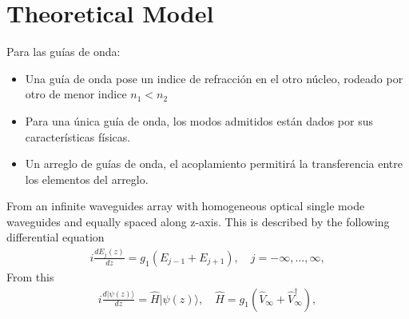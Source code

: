 \documentclass[a4paper, amsfonts, amssymb, amsmath, reprint, showkeys, nofootinbib ,twoside]{revtex4-2}
\begin{document}
\section{Theoretical Model} 
Para las guías de onda:
\begin{itemize}
    \item Una guía de onda pose un indice de refracción en el otro núcleo, rodeado por otro de menor indice $n_1 < n_2$
    \item Para una única guía de onda, los modos admitidos están dados por sus características físicas. 
    \item Un arreglo de guías de onda, el acoplamiento permitirá la transferencia entre los elementos del arreglo.
\end{itemize} 
From an infinite waveguides array with homogeneous optical single mode waveguides and equally spaced along z-axis. This is described by the
following differential equation \cite{Jones1965Coupling}	
\begin{align}\label{EqEner}
    i \frac{dE_j(z)}{dz} = g_1 (E_{j-1} + E_{j+1}), \quad j = -\infty, \dots, \infty,
\end{align}
From this 
\begin{align}
     i \frac{d|\psi(z)\rangle}{dz} = \hat{H}|\psi(z)\rangle, \quad \hat{H} = g_1 \left( \hat{V}_\infty + \hat{V}_\infty^\dagger \right),
\end{align} 
\end{document}
